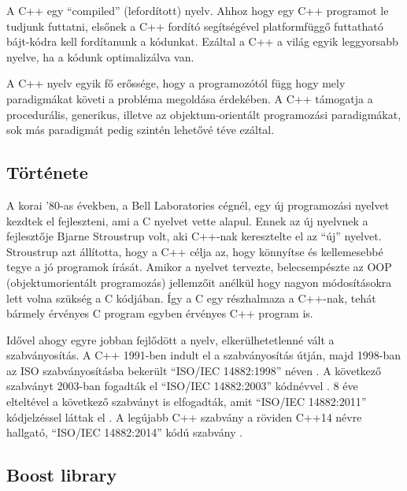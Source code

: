 \documentclass[a4paper,12pt]{report}
\begin{document}
\vspace{2mm}
A C++ egy ``compiled'' (lefordított) nyelv. Ahhoz hogy egy C++ programot le tudjunk futtatni, elsőnek a C++ fordító segítségével platformfüggő futtatható bájt-kódra kell fordítanunk a kódunkat. Ezáltal a C++ a világ egyik leggyorsabb nyelve, ha a kódunk optimalizálva van.

A C++ nyelv egyik fő erőssége, hogy a programozótól függ hogy mely paradigmákat követi a probléma megoldása érdekében. A C++ támogatja a procedurális, generikus, illetve az objektum-orientált programozási paradigmákat, sok más paradigmát pedig szintén lehetővé téve ezáltal.



\subsection{Története}
\label{cpphistory}

A korai '80-as években, a Bell Laboratories cégnél, egy új programozási nyelvet kezdtek el fejleszteni, ami a C nyelvet vette alapul. Ennek az új nyelvnek a fejlesztője Bjarne Stroustrup volt, aki C++-nak keresztelte el az ``új'' nyelvet. Stroustrup azt állította, hogy a C++ célja az, hogy könnyítse és kellemesebbé tegye a jó programok írását. Amikor a nyelvet tervezte, belecsempészte az OOP (objektumorientált programozás) jellemzőit anélkül hogy nagyon módosításokra lett volna szükség a C kódjában. Így a C egy részhalmaza a C++-nak, tehát bármely érvényes C program egyben érvényes C++ program is.

\vspace{2mm}
Idővel ahogy egyre jobban fejlődött a nyelv, elkerülhetetlenné vált a szabványosítás. A C++ 1991-ben indult el a szabványosítás útján, majd 1998-ban az ISO szabványosításba bekerült ``ISO/IEC 14882:1998'' néven \cite{c++98}. A következő szabványt 2003-ban fogadták el ``ISO/IEC 14882:2003'' kódnévvel \cite{c++03}. 8 éve elteltével a következő szabványt is elfogadták, amit ``ISO/IEC 14882:2011'' kódjelzéssel láttak el \cite{c++11}. A legújabb C++ szabvány a röviden C++14 névre hallgató, ``ISO/IEC 14882:2014'' kódú szabvány \cite{c++14}.

\subsection{Boost library}
\label{boost}
\end{document}
